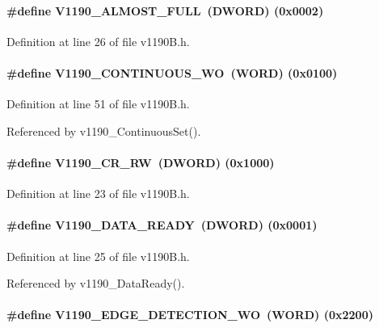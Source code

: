 \paragraph[{V1190\_\-ALMOST\_\-FULL}]{\setlength{\rightskip}{0pt plus 5cm}\#define V1190\_\-ALMOST\_\-FULL~({\bf DWORD}) (0x0002)}\hfill\label{v1190B_8h_add543845434c3d57d6251d41a48f6dba}


Definition at line 26 of file v1190B.h.
\paragraph[{V1190\_\-CONTINUOUS\_\-WO}]{\setlength{\rightskip}{0pt plus 5cm}\#define V1190\_\-CONTINUOUS\_\-WO~({\bf WORD}) (0x0100)}\hfill\label{v1190B_8h_a45d7da47e8804b066357cd04b9e684e2}


Definition at line 51 of file v1190B.h.

Referenced by v1190\_\-ContinuousSet().
\paragraph[{V1190\_\-CR\_\-RW}]{\setlength{\rightskip}{0pt plus 5cm}\#define V1190\_\-CR\_\-RW~({\bf DWORD}) (0x1000)}\hfill\label{v1190B_8h_a24220cae747ac16f14392afc101af858}


Definition at line 23 of file v1190B.h.
\paragraph[{V1190\_\-DATA\_\-READY}]{\setlength{\rightskip}{0pt plus 5cm}\#define V1190\_\-DATA\_\-READY~({\bf DWORD}) (0x0001)}\hfill\label{v1190B_8h_a7f70cfd95a9c821b618c798be1e16a80}


Definition at line 25 of file v1190B.h.

Referenced by v1190\_\-DataReady().
\paragraph[{V1190\_\-EDGE\_\-DETECTION\_\-WO}]{\setlength{\rightskip}{0pt plus 5cm}\#define V1190\_\-EDGE\_\-DETECTION\_\-WO~({\bf WORD}) (0x2200)}\hfill\label{v1190B_8h_a01c0586f227c97407091ab5f55d87252}


